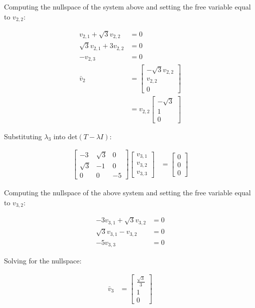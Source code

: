 Computing the nullspace of the system above and setting the free variable equal to $v_{2,2}$:

\begin{align*}
v_{2,1}+\sqrt{ 3 }v_{2,2}&=0\\[10pt]
\sqrt{ 3 }v_{2,1}+3v_{2,2}&=0\\[10pt]
-v_{2,3}&=0\\[10pt]
\bar{v}_{2}&=\begin{bmatrix}
-\sqrt{ 3}v_{2,2} \\
v_{2,2} \\
0
\end{bmatrix}\\[10pt]
&=
v_{2,2}\begin{bmatrix}
-\sqrt{ 3 } \\
1 \\
0
\end{bmatrix}
\end{align*}




Substituting $\lambda_{3}$ into $\text{det}(T-\lambda I)$:

\begin{align*}
\begin{bmatrix}
-3 & \sqrt{ 3 } & 0 \\
\sqrt{ 3 } & -1 & 0 \\
0 & 0 & -5
\end{bmatrix}\begin{bmatrix}
v_{3,1} \\
v_{3,2} \\
v_{3,3}
\end{bmatrix}&=
\begin{bmatrix}
0 \\
0 \\
0
\end{bmatrix}
\end{align*}

Computing the nullspace of the above system and setting the free variable equal to $v_{3,2}$:

\begin{align*}
-3v_{3,1}+\sqrt{ 3 }v_{3,2}&=0\\[10pt]
\sqrt{ 3 }v_{3,1}-v_{3,2}&=0\\[10pt]
-5v_{3,3}&=0
\end{align*}

Solving for the nullspace:

\begin{align*}
\bar{v}_{3}&=\begin{bmatrix}
\frac{\sqrt{ 3 }}{3} \\
1 \\
0
\end{bmatrix}
\end{align*}


